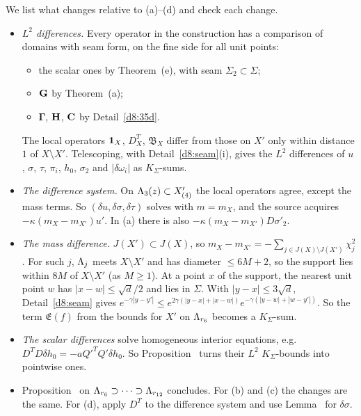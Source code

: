 \begin{detail}\label{d8:ix9}
We list what changes relative to (a)--(d) and check each change.
\begin{itemize}
\item \emph{$L^2$ differences.} Every operator in the construction has a comparison of domains with seam form, on the fine side for all unit points:
  \begin{itemize}
  \item the scalar ones by Theorem~(e), with seam $\Sigma_2\subset\Sigma$;
  \item $\mathbf G$ by Theorem~(a);
  \item $\boldsymbol\Gamma$, $\mathbf H$, $\mathbf C$ by Detail~\ref{d8:35d}.
  \end{itemize}
  The local operators $\mathbf 1_X$, $D^T_X$, $\mathfrak B_X$ differ from those on $X'$ only within distance $1$ of $X\setminus X'$. Telescoping, with Detail~\ref{d8:seam}(i), gives the $L^2$ differences of $u$, $\sigma$, $\tau$, $\pi_i$, $h_0$, $\sigma_2$ and $|\delta\omega_i|$ as $K_\Sigma$-sums.
\item \emph{The difference system.} On $\Lambda_3(z)\subset X'_{(4)}$ the local operators agree, except the mass terms. So $(\delta u,\delta\sigma,\delta\tau)$ solves  with $m=m_X$, and the source acquires $-\kappa(m_X-m_{X'})u'$. In (a) there is also $-\kappa(m_X-m_{X'})D\sigma'_2$.
\item \emph{The mass difference.} $J(X')\subset J(X)$, so $m_X-m_{X'}=-\sum_{j\in J(X)\setminus J(X')}\chi_j^2$. For such $j$, $\Lambda_j$ meets $X\setminus X'$ and has diameter $\le6M+2$, so the support lies within $8M$ of $X\setminus X'$ (as $M\ge1$). At a point $x$ of the support, the nearest unit point $w$ has $|x-w|\le\sqrt d/2$ and lies in $\Sigma$. With $|y-x|\le3\sqrt d$, Detail~\ref{d8:seam} gives $e^{-\gamma|y-y'|}\le e^{2\gamma(|y-x|+|x-w|)}e^{-\gamma(|y-w|+|w-y'|)}$. So the term $\mathfrak E(f)$ from the bounds for $X'$ on $\Lambda_{r_6}$ becomes a $K_\Sigma$-sum.
\item \emph{The scalar differences} solve homogeneous interior equations, e.g.\ $D^TD\delta h_0=-aQ'^TQ'\delta h_0$. So Proposition~ turns their $L^2$ $K_\Sigma$-bounds into pointwise ones.
\item Proposition~ on $\Lambda_{r_6}\supset\dots\supset\Lambda_{r_{12}}$ concludes. For (b) and (c) the changes are the same. For (d), apply $D^T$ to the difference system and use Lemma~ for $\delta\sigma$.
\end{itemize}
\end{detail}



